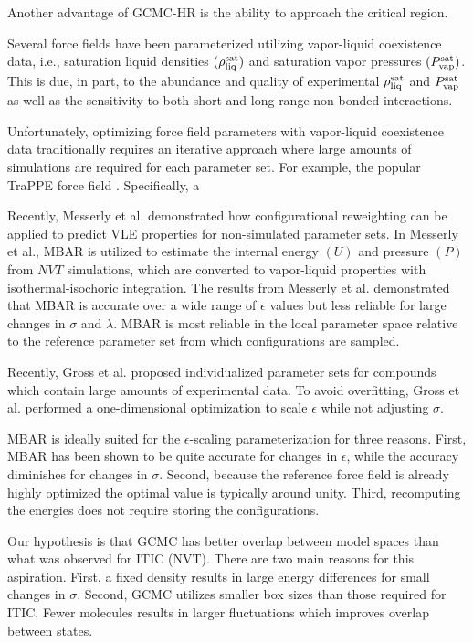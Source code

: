 \documentclass[11pt,a4paper]{article}
\begin{document}
Another advantage of GCMC-HR is the ability to approach the critical region.

Several force fields have been parameterized utilizing vapor-liquid coexistence data, i.e., saturation liquid densities $(\rho_{\rm liq}^{\rm sat})$ and saturation vapor pressures $(P_{\rm vap}^{\rm sat})$. This is due, in part, to the abundance and quality of experimental $\rho_{\rm liq}^{\rm sat}$ and $P_{\rm vap}^{\rm sat}$ as well as the sensitivity to both short and long range non-bonded interactions.

Unfortunately, optimizing force field parameters with vapor-liquid coexistence data traditionally requires an iterative approach where large amounts of simulations are required for each parameter set. For example, the popular TraPPE force field . Specifically, a 

Recently, Messerly et al. demonstrated how configurational reweighting can be applied to predict VLE properties for non-simulated parameter sets. In Messerly et al., MBAR is utilized to estimate the internal energy $(U)$ and pressure $(P)$ from $NVT$ simulations, which are converted to vapor-liquid properties with isothermal-isochoric integration. The results from Messerly et al. demonstrated that MBAR is accurate over a wide range of $\epsilon$ values but less reliable for large changes in $\sigma$ and $\lambda$. MBAR is most reliable in the local parameter space relative to the reference parameter set from which configurations are sampled.

Recently, Gross et al. proposed individualized parameter sets for compounds which contain large amounts of experimental data. To avoid overfitting, Gross et al. performed a one-dimensional optimization to scale $\epsilon$ while not adjusting $\sigma$. 

MBAR is ideally suited for the $\epsilon$-scaling parameterization for three reasons. First, MBAR has been shown to be quite accurate for changes in $\epsilon$, while the accuracy diminishes for changes in $\sigma$. Second, because the reference force field is already highly optimized the optimal value is typically around unity. Third, recomputing the energies does not require storing the configurations.

Our hypothesis is that GCMC has better overlap between model spaces than what was observed for ITIC (NVT). There are two main reasons for this aspiration. First, a fixed density results in large energy differences for small changes in $\sigma$. Second, GCMC utilizes smaller box sizes than those required for ITIC. Fewer molecules results in larger fluctuations which improves overlap between states.
\end{document}
